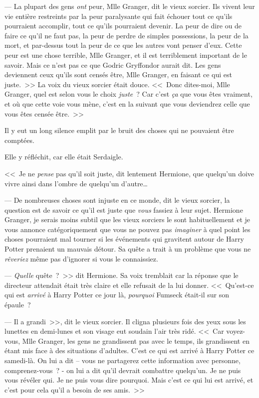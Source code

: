 --- La plupart des gens \emph{ont} peur, Mlle Granger, dit le vieux sorcier. Ils vivent leur vie entière restreints par la peur paralysante qui fait échouer tout ce qu'ils pourraient accomplir, tout ce qu'ils pourraient devenir. La peur de dire ou de faire ce qu'il ne faut pas, la peur de perdre de simples possessions, la peur de la mort, et par-dessus tout la peur de ce que les autres vont penser d'eux. Cette peur est une chose terrible, Mlle Granger, et il est terriblement important de le savoir. Mais ce n'est pas ce que Godric Gryffondor aurait dit. Les gens deviennent ceux qu'ils sont censés être, Mlle Granger, en faisant ce qui est juste.~>> La voix du vieux sorcier était douce. <<~Donc dites-moi, Mlle Granger, quel est selon vous le choix \emph{juste}~? Car c'est \emph{ça} que vous êtes vraiment, et où que cette voie vous mène, c'est en la suivant que vous deviendrez celle que vous êtes censée être.~>>

Il y eut un long silence emplit par le bruit des choses qui ne pouvaient être comptées.

Elle y réfléchit, car elle était Serdaigle.

<<~Je ne \emph{pense} pas qu'il soit juste, dit lentement Hermione, que quelqu'un doive vivre ainsi dans l'ombre de quelqu'un d'autre…

--- De nombreuses choses sont injuste en ce monde, dit le vieux sorcier, la question est de savoir ce qu'il est juste que \emph{vous} fassiez à leur sujet. Hermione Granger, je serais moins subtil que les vieux sorciers le sont habituellement et je vous annonce catégoriquement que vous ne pouvez pas \emph{imaginer} à quel point les choses pourraient mal tourner si les événements qui gravitent autour de Harry Potter prenaient un mauvais détour. Sa quête a trait à un problème que vous ne \emph{rêveriez} même pas d'ignorer si vous le connaissiez.

--- \emph{Quelle} quête~?~>> dit Hermione. Sa voix tremblait car la réponse que le directeur attendait était très claire et elle refusait de la lui donner. <<~Qu'est-ce qui est \emph{arrivé} à Harry Potter ce jour là, \emph{pourquoi} Fumseck était-il sur son épaule~?

--- Il a grandi~>>, dit le vieux sorcier. Il cligna plusieurs fois des yeux sous les lunettes en demi-lunes et son visage eut soudain l'air très ridé. <<~Car voyez-vous, Mlle Granger, les gens ne grandissent pas avec le temps, ils grandissent en étant mis face à des situations d'adultes. C'est ce qui est arrivé à Harry Potter ce samedi-là. On lui a dit -- vous ne partagerez cette information avec personne, comprenez-vous~? - on lui a dit qu'il devrait combattre quelqu'un. Je ne puis vous révéler qui. Je ne puis vous dire pourquoi. Mais c'est ce qui lui est arrivé, et c'est pour cela qu'il a besoin de ses amis.~>>

